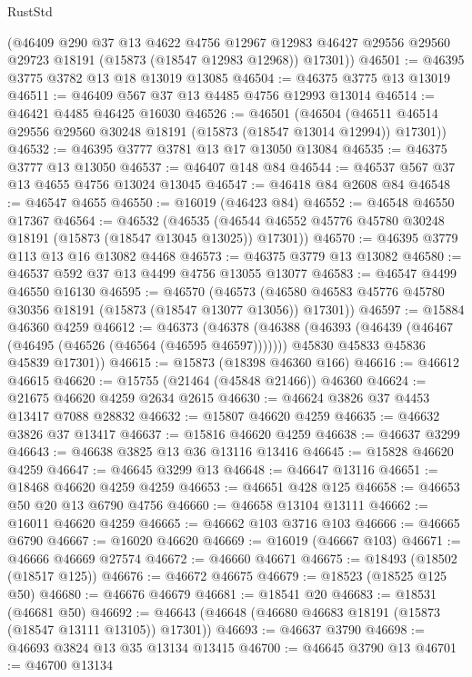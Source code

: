 \begin{lexlean}{RustStd}
\begin{coremodule}
      (@46409
        @290
        @37
        @13
        @4622
        @4756
        @12967
        @12983
        @46427
        @29556
        @29560
        @29723
        @18191
        (@15873 (@18547 @12983 @12968))
        @17301))
@46501 := @46395 @3775 @3782 @13 @18 @13019 @13085
@46504 := @46375 @3775 @13 @13019
@46511 := @46409 @567 @37 @13 @4485 @4756 @12993 @13014
@46514 := @46421 @4485 @46425 @16030
@46526 := @46501
    (@46504 (@46511 @46514 @29556 @29560 @30248 @18191 (@15873 (@18547 @13014 @12994)) @17301))
@46532 := @46395 @3777 @3781 @13 @17 @13050 @13084
@46535 := @46375 @3777 @13 @13050
@46537 := @46407 @148 @84
@46544 := @46537 @567 @37 @13 @4655 @4756 @13024 @13045
@46547 := @46418 @84 @2608 @84
@46548 := @46547 @4655
@46550 := @16019 (@46423 @84)
@46552 := @46548 @46550 @17367
@46564 := @46532
    (@46535 (@46544 @46552 @45776 @45780 @30248 @18191 (@15873 (@18547 @13045 @13025)) @17301))
@46570 := @46395 @3779 @113 @13 @16 @13082 @4468
@46573 := @46375 @3779 @13 @13082
@46580 := @46537 @592 @37 @13 @4499 @4756 @13055 @13077
@46583 := @46547 @4499 @46550 @16130
@46595 := @46570
    (@46573 (@46580 @46583 @45776 @45780 @30356 @18191 (@15873 (@18547 @13077 @13056)) @17301))
@46597 := @15884 @46360 @4259
@46612 := @46373
    (@46378
      (@46388
        (@46393 (@46439 (@46467 (@46495 (@46526 (@46564 (@46595 @46597)))))))
        @45830
        @45833
        @45836
        @45839
        @17301))
@46615 := @15873 (@18398 @46360 @166)
@46616 := @46612 @46615
@46620 := @15755 (@21464 (@45848 @21466)) @46360
@46624 := @21675 @46620 @4259 @2634 @2615
@46630 := @46624 @3826 @37 @4453 @13417 @7088 @28832
@46632 := @15807 @46620 @4259
@46635 := @46632 @3826 @37 @13417
@46637 := @15816 @46620 @4259
@46638 := @46637 @3299
@46643 := @46638 @3825 @13 @36 @13116 @13416
@46645 := @15828 @46620 @4259
@46647 := @46645 @3299 @13
@46648 := @46647 @13116
@46651 := @18468 @46620 @4259 @4259
@46653 := @46651 @428 @125
@46658 := @46653 @50 @20 @13 @6790 @4756
@46660 := @46658 @13104 @13111
@46662 := @16011 @46620 @4259
@46665 := @46662 @103 @3716 @103
@46666 := @46665 @6790
@46667 := @16020 @46620
@46669 := @16019 (@46667 @103)
@46671 := @46666 @46669 @27574
@46672 := @46660 @46671
@46675 := @18493 (@18502 (@18517 @125))
@46676 := @46672 @46675
@46679 := @18523 (@18525 @125 @50)
@46680 := @46676 @46679
@46681 := @18541 @20
@46683 := @18531 (@46681 @50)
@46692 := @46643 (@46648 (@46680 @46683 @18191 (@15873 (@18547 @13111 @13105)) @17301))
@46693 := @46637 @3790
@46698 := @46693 @3824 @13 @35 @13134 @13415
@46700 := @46645 @3790 @13
@46701 := @46700 @13134

\end{coremodule}
\end{lexlean}
